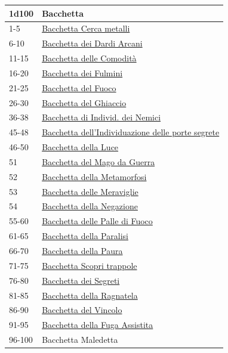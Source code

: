 \begin{multicols}{2}
{{\small\begin{tabularx}{0.45\textwidth}{lX}
		\toprule
\textbf{1d100} & \textbf{Bacchetta}\\
\toprule
1-5 & \hyperlink{BacchettaCercametalli}{Bacchetta Cerca metalli}\\
6-10 & \hyperlink{BacchettadeiDardiArcani}{Bacchetta dei Dardi Arcani}\\
11-15 & \hyperlink{BacchettadelleComodità}{Bacchetta delle Comodità}\\
16-20 & \hyperlink{BacchettadeiFulmini}{Bacchetta dei Fulmini}\\
21-25 & \hyperlink{BacchettadelFuoco}{Bacchetta del Fuoco}\\
26-30 & \hyperlink{BacchettadelGhiaccio}{Bacchetta del Ghiaccio}\\
36-38 & \hyperlink{BacchettadiIndivid.deiNemici}{Bacchetta di Individ. dei Nemici}\\
45-48 & \hyperlink{Bacchettadell'Individuazionedelleportesegrete}{Bacchetta dell'Individuazione delle porte segrete}\\
46-50 & \hyperlink{BacchettadellaLuce}{Bacchetta della Luce}\\
51 & \hyperlink{BacchettadelMagodaGuerra}{Bacchetta del Mago da Guerra}\\
52 & \hyperlink{BacchettadellaMetamorfosi}{Bacchetta della Metamorfosi}\\
53 & \hyperlink{BacchettadelleMeraviglie}{Bacchetta delle Meraviglie}\\
54 & \hyperlink{BacchettadellaNegazione}{Bacchetta della Negazione}\\
55-60 & \hyperlink{BacchettadellePallediFuoco}{Bacchetta delle Palle di Fuoco}\\
61-65 & \hyperlink{BacchettadellaParalisi}{Bacchetta della Paralisi}\\
66-70 & \hyperlink{BacchettadellaPaura}{Bacchetta della Paura}\\
71-75 & \hyperlink{BacchettaScopritrappole}{Bacchetta Scopri trappole}\\
76-80 & \hyperlink{BacchettadeiSegreti}{Bacchetta dei Segreti}\\
81-85 & \hyperlink{BacchettadellaRagnatela}{Bacchetta della Ragnatela}\\
86-90 & \hyperlink{BacchettadelVincolo}{Bacchetta del Vincolo}\\
91-95 & \hyperlink{BacchettadellaFugaAssistita}{Bacchetta della Fuga Assistita}\\
96-100 & Bacchetta Maledetta
\end{tabularx}}

}
\end{multicols}
